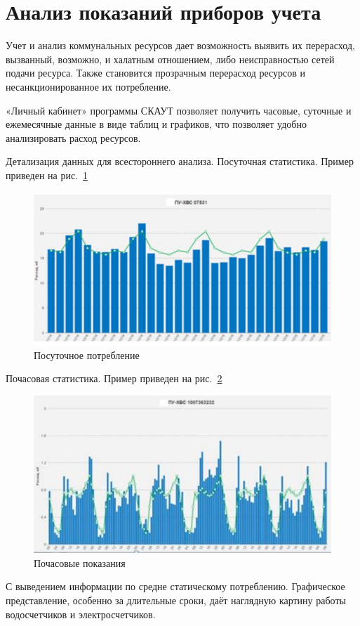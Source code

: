 
\section{Анализ показаний приборов учета}

Учет и анализ коммунальных ресурсов дает возможность выявить их перерасход, вызванный, возможно, и халатным отношением, либо неисправностью сетей подачи ресурса. Также становится прозрачным перерасход ресурсов и несанкционированное их потребление.\cite{journal}

«Личный кабинет» программы СКАУТ позволяет получить часовые, суточные и ежемесячные данные в виде таблиц и графиков, что позволяет удобно анализировать расход ресурсов.

Детализация данных для всестороннего анализа.
Посуточная статистика. Пример приведен на рис.~\ref{fig:day}
\begin{figure}[H]
	\centering
	\includegraphics[width=0.7\linewidth]{pics/day}
	\caption{Посуточное потребление}
	\label{fig:day} 
\end{figure}
Почасовая статистика. Пример приведен на рис.~\ref{fig:hour}
\begin{figure}[H]
	\centering
	\includegraphics[width=0.7\linewidth]{pics/hour}
	\caption{Почасовые показания}
	\label{fig:hour} 
\end{figure}

С выведением информации по средне статическому потреблению.
Графическое представление, особенно за длительные сроки, даёт наглядную картину работы водосчетчиков и электросчетчиков. 


